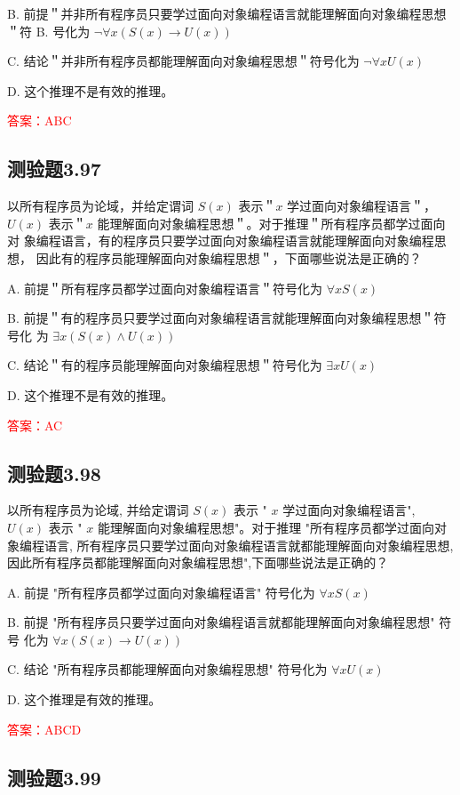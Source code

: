 \documentclass[UTF8, heading=true]{ctexart}
\begin{document}
B. 前提＂并非所有程序员只要学过面向对象编程语言就能理解面向对象编程思想＂符 B. 号化为 $\neg \forall x(S(x) \rightarrow U(x))$

C. 结论＂并非所有程序员都能理解面向对象编程思想＂符号化为 $\neg \forall x U(x)$

D. 这个推理不是有效的推理。

\textcolor{red}{答案：ABC}

\subsection{测验题3.97}

以所有程序员为论域，并给定谓词 $S(x)$ 表示＂$x$ 学过面向对象编程语言＂，$U(x)$ 
表示＂$x$ 能理解面向对象编程思想＂。对于推理＂所有程序员都学过面向对
象编程语言，有的程序员只要学过面向对象编程语言就能理解面向对象编程思想，
因此有的程序员能理解面向对象编程思想＂，下面哪些说法是正确的？

A. 前提＂所有程序员都学过面向对象编程语言＂符号化为 $\forall x S(x)$

B. 前提＂有的程序员只要学过面向对象编程语言就能理解面向对象编程思想＂符号化
为 $\exists x(S(x) \wedge U(x))$

C. 结论＂有的程序员能理解面向对象编程思想＂符号化为 $\exists x U(x)$

D. 这个推理不是有效的推理。

\textcolor{red}{答案：AC}

\subsection{测验题3.98}

以所有程序员为论域, 并给定谓词 $S(x)$ 表示 " $x$ 学过面向对象编程语言", $U(x)$ 表示 " $x$ 能理解面向对象编程思想"。对于推理 "所有程序员都学过面向对象编程语言, 所有程序员只要学过面向对象编程语言就都能理解面向对象编程思想,因此所有程序员都能理解面向对象编程思想",下面哪些说法是正确的？

A. 前提 "所有程序员都学过面向对象编程语言" 符号化为 $\forall x S(x)$

B. 前提 "所有程序员只要学过面向对象编程语言就都能理解面向对象编程思想" 符号
化为 $\forall x(S(x) \rightarrow U(x))$

C. 结论 "所有程序员都能理解面向对象编程思想" 符号化为 $\forall x U(x)$

D. 这个推理是有效的推理。

\textcolor{red}{答案：ABCD}

\subsection{测验题3.99}
\end{document}
